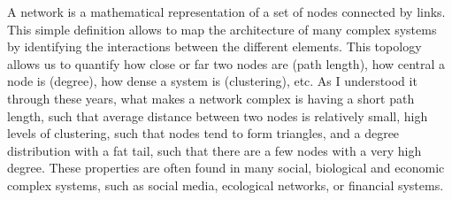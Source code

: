 A network is a mathematical representation of a set of nodes connected by links. This simple definition allows to map the architecture of many complex systems by identifying the interactions between the different elements. This topology allows us to quantify how close or far two nodes are (path length), how central a node is (degree), how dense a system is (clustering), etc. As I understood it through these years, what makes a network complex is having a short path length, such that average distance between two nodes is relatively small, high levels of clustering, such that nodes tend to form triangles, and a degree distribution with a fat tail, such that there are a few nodes with a very high degree. These properties are often found in many social, biological and economic complex systems, such as social media, ecological networks, or financial systems.

